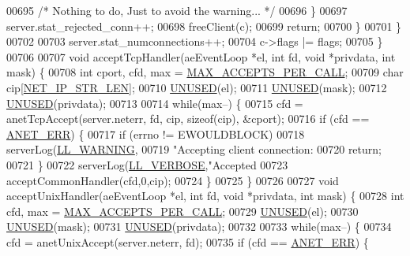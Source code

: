 \begin{DoxyCode}
{{{{{00695                 \textcolor{comment}{/* Nothing to do, Just to avoid the warning... */}
00696             \}
00697             server.stat\_rejected\_conn++;
00698             freeClient(c);
00699             \textcolor{keywordflow}{return};
00700         \}
00701     \}
00702 
00703     server.stat\_numconnections++;
00704     c->flags |= flags;
00705 \}
00706 
00707 \textcolor{keywordtype}{void} acceptTcpHandler(aeEventLoop *el, \textcolor{keywordtype}{int} fd, \textcolor{keywordtype}{void} *privdata, \textcolor{keywordtype}{int} mask) \{
00708     \textcolor{keywordtype}{int} cport, cfd, max = \hyperlink{networking_8c_a49d737d8dce68303493f75ea5512ca16}{MAX\_ACCEPTS\_PER\_CALL};
00709     \textcolor{keywordtype}{char} cip[\hyperlink{server_8h_ad97c5405ed22a94e9fcc10fba577d6c0}{NET\_IP\_STR\_LEN}];
00710     \hyperlink{server_8h_ae7c9dc8f13568a9c856573751f1ee1ec}{UNUSED}(el);
00711     \hyperlink{server_8h_ae7c9dc8f13568a9c856573751f1ee1ec}{UNUSED}(mask);
00712     \hyperlink{server_8h_ae7c9dc8f13568a9c856573751f1ee1ec}{UNUSED}(privdata);
00713 
00714     \textcolor{keywordflow}{while}(max--) \{
00715         cfd = anetTcpAccept(server.neterr, fd, cip, \textcolor{keyword}{sizeof}(cip), &cport);
00716         \textcolor{keywordflow}{if} (cfd == \hyperlink{anet_8h_a0697b7774a7e0f4ef141839fe93536fe}{ANET\_ERR}) \{
00717             \textcolor{keywordflow}{if} (errno != EWOULDBLOCK)
00718                 serverLog(\hyperlink{server_8h_a31229b9334bba7d6be2a72970967a14b}{LL\_WARNING},
00719                     \textcolor{stringliteral}{"Accepting client connection: %
00720             \textcolor{keywordflow}{return};
00721         \}
00722         serverLog(\hyperlink{server_8h_a479b60032f8da6d8ad72e1a9d0809950}{LL\_VERBOSE},\textcolor{stringliteral}{"Accepted %
00723         acceptCommonHandler(cfd,0,cip);
00724     \}
00725 \}
00726 
00727 \textcolor{keywordtype}{void} acceptUnixHandler(aeEventLoop *el, \textcolor{keywordtype}{int} fd, \textcolor{keywordtype}{void} *privdata, \textcolor{keywordtype}{int} mask) \{
00728     \textcolor{keywordtype}{int} cfd, max = \hyperlink{networking_8c_a49d737d8dce68303493f75ea5512ca16}{MAX\_ACCEPTS\_PER\_CALL};
00729     \hyperlink{server_8h_ae7c9dc8f13568a9c856573751f1ee1ec}{UNUSED}(el);
00730     \hyperlink{server_8h_ae7c9dc8f13568a9c856573751f1ee1ec}{UNUSED}(mask);
00731     \hyperlink{server_8h_ae7c9dc8f13568a9c856573751f1ee1ec}{UNUSED}(privdata);
00732 
00733     \textcolor{keywordflow}{while}(max--) \{
00734         cfd = anetUnixAccept(server.neterr, fd);
00735         \textcolor{keywordflow}{if} (cfd == \hyperlink{anet_8h_a0697b7774a7e0f4ef141839fe93536fe}{ANET\_ERR}) \{
}}}}}}}
\end{DoxyCode}

